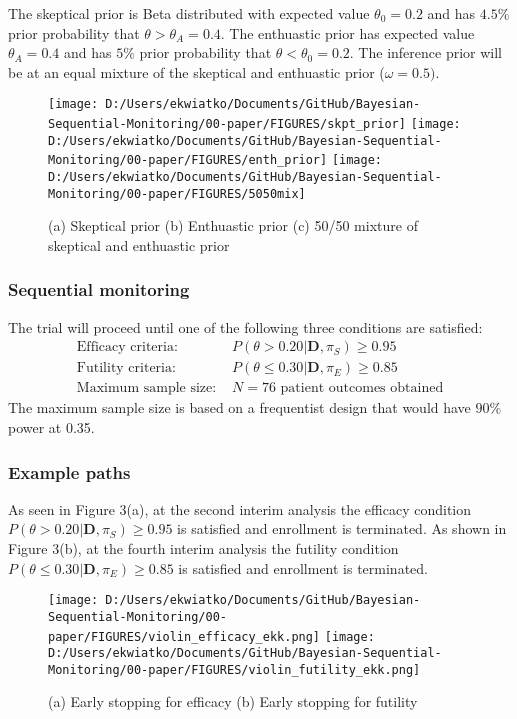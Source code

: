 \documentclass[12pt]{article}
\begin{document}
The skeptical prior is Beta distributed with expected value $\theta_0=0.2$ and has $4.5\%$ prior probability that $\theta>\theta_A=0.4$. The enthuastic prior has expected value $\theta_A=0.4$ and has $5\%$ prior probability that $\theta<\theta_0=0.2$. The inference prior will be at an equal mixture of the skeptical and enthuastic prior ($\omega=0.5)$.
\begin{figure}
\texttt{[image: D:/Users/ekwiatko/Documents/GitHub/Bayesian-Sequential-Monitoring/00-paper/FIGURES/skpt\_prior]}
\texttt{[image: D:/Users/ekwiatko/Documents/GitHub/Bayesian-Sequential-Monitoring/00-paper/FIGURES/enth\_prior]}
\texttt{[image: D:/Users/ekwiatko/Documents/GitHub/Bayesian-Sequential-Monitoring/00-paper/FIGURES/5050mix]}
\caption{(a) Skeptical prior (b) Enthuastic prior (c) 50/50 mixture of skeptical and enthuastic prior}
\end{figure}

\newpage
\subsubsection{Sequential monitoring}
The trial will proceed until one of the following three conditions are satisfied:
\begin{align*}
\text{Efficacy criteria: }&P(\theta>0.20|\mathbf{D},\pi_S)\geq 0.95\\
\text{Futility criteria: }&P(\theta\leq 0.30|\mathbf{D},\pi_E)\geq 0.85\\
\text{Maximum sample size: }&N=76 \text{ patient outcomes obtained}
\end{align*}
The maximum sample size is based on a frequentist design that would have $90\%$ power at 0.35.


\newpage
\subsubsection{Example paths}
As seen in Figure 3(a), at the second interim analysis the efficacy condition $P(\theta>0.20|\mathbf{D},\pi_S)\geq 0.95$ is satisfied and enrollment is terminated. As shown in Figure 3(b), at the fourth interim analysis the futility condition $P(\theta\leq 0.30|\mathbf{D},\pi_E)\geq 0.85$ is satisfied and enrollment is terminated.
\begin{figure}
\texttt{[image: D:/Users/ekwiatko/Documents/GitHub/Bayesian-Sequential-Monitoring/00-paper/FIGURES/violin\_efficacy\_ekk.png]}
\texttt{[image: D:/Users/ekwiatko/Documents/GitHub/Bayesian-Sequential-Monitoring/00-paper/FIGURES/violin\_futility\_ekk.png]}
\caption{(a) Early stopping for efficacy (b) Early stopping for futility}
\end{figure}
\newpage
\end{document}
